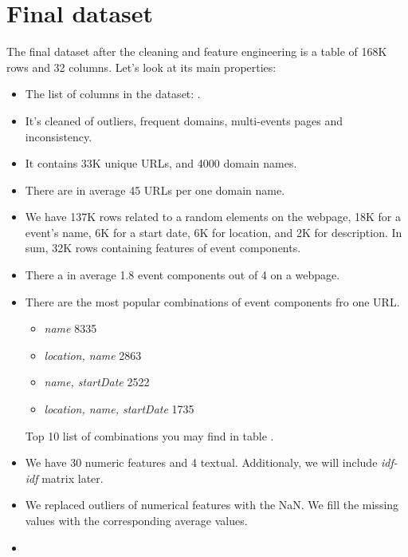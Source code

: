 \section{Final dataset}
The final dataset after the cleaning and feature engineering is a table of 168K rows and 32 columns. Let's look at its main properties: 

\begin{itemize}
    \item The list of columns in the dataset: .
    \item It's cleaned of outliers, frequent domains, multi-events pages and inconsistency. 
    \item It contains 33K unique URLs, and  4000 domain names. 
    \item There are in average 45 URLs per one domain name. 
    \item We have 137K rows related to a random elements on the webpage, 18K for a event's name, 6K for a start date, 6K for location, and 2K for description. In sum, 32K rows containing features of event components. 
    \item There a in average 1.8 event components out of 4 on a webpage. 
    \item There are the most popular combinations of event components fro one URL. 
    \begin{itemize}
        \item \textit{name} 8335
        \item \textit{location, name} 2863 
        \item \textit{name, startDate} 2522 
        \item \textit{location, name, startDate} 1735
    \end{itemize}
    Top 10 list of combinations you may find in table .
    \item We have 30 numeric features and 4 textual. Additionaly, we will include \textit{idf-idf} matrix later.
    \item We replaced outliers of numerical features with the NaN. We fill the missing values with the corresponding average values.  
    \item 
\end{itemize}


